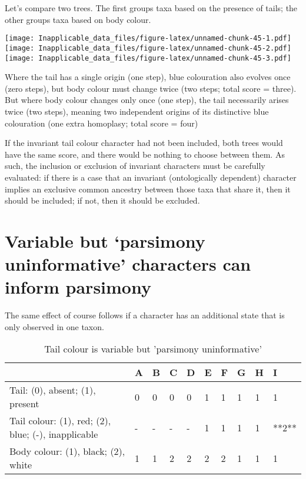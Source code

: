 \documentclass[]{book}
\theoremstyle{definition}
\theoremstyle{definition}
\theoremstyle{definition}
\theoremstyle{remark}
\begin{document}
Let's compare two trees. The first groups taxa based on the presence of
tails; the other groups taxa based on body colour.

\texttt{[image: Inapplicable\_data\_files/figure-latex/unnamed-chunk-45-1.pdf]}
\texttt{[image: Inapplicable\_data\_files/figure-latex/unnamed-chunk-45-2.pdf]}
\texttt{[image: Inapplicable\_data\_files/figure-latex/unnamed-chunk-45-3.pdf]}

Where the tail has a single origin (one step), blue colouration also
evolves once (zero steps), but body colour must change twice (two steps;
total score = three). But where body colour changes only once (one
step), the tail necessarily arises twice (two steps), meaning two
independent origins of its distinctive blue colouration (one extra
homoplasy; total score = four)

If the invariant tail colour character had not been included, both trees
would have the same score, and there would be nothing to choose between
them. As such, the inclusion or exclusion of invariant characters must
be carefully evaluated: if there is a case that an invariant
(ontologically dependent) character implies an exclusive common ancestry
between those taxa that share it, then it should be included; if not,
then it should be excluded.

\hypertarget{puip}{%
\section{Variable but `parsimony uninformative' characters can inform
parsimony}\label{puip}}

The same effect of course follows if a character has an additional state
that is only observed in one taxon.

\begin{table}

\caption{\label{tab:unnamed-chunk-46}Tail colour is variable but 'parsimony uninformative'}
\centering
\begin{tabular}[t]{l|l|l|l|l|l|l|l|l|l}
\hline
  & A & B & C & D & E & F & G & H & I\\
\hline
Tail: (0), absent; (1), present & 0 & 0 & 0 & 0 & 1 & 1 & 1 & 1 & 1\\
\hline
Tail colour: (1), red; (2), blue; (-), inapplicable & - & - & - & - & 1 & 1 & 1 & 1 & **2**\\
\hline
Body colour: (1), black; (2), white & 1 & 1 & 2 & 2 & 2 & 2 & 1 & 1 & 1\\
\hline
\end{tabular}
\end{table}
\end{document}
